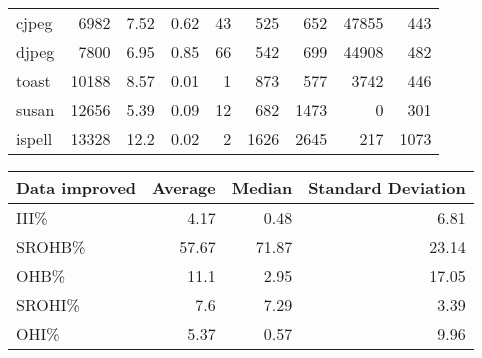 \begin{tabular}{lrrrrrrrr}
 cjpeg          &           6982 &     7.52 &   0.62 &   43 &    525 &          652 & 47855 &   443 \\
 djpeg          &           7800 &     6.95 &   0.85 &   66 &    542 &          699 & 44908 &   482 \\
 toast          &          10188 &     8.57 &   0.01 &    1 &    873 &          577 &  3742 &   446 \\
 susan          &          12656 &     5.39 &   0.09 &   12 &    682 &         1473 &     0 &   301 \\
 ispell         &          13328 &    12.2  &   0.02 &    2 &   1626 &         2645 &   217 &  1073 \\
\hline
\end{tabular}

\begin{tabular}{lrrr}
\hline
 Data improved   &   Average &   Median &   Standard Deviation \\
\hline
 III\%            &      4.17 &     0.48 &                 6.81 \\
 SROHB\%          &     57.67 &    71.87 &                23.14 \\
 OHB\%            &     11.1  &     2.95 &                17.05 \\
 SROHI\%          &      7.6  &     7.29 &                 3.39 \\
 OHI\%            &      5.37 &     0.57 &                 9.96 \\
\hline
\end{tabular}

